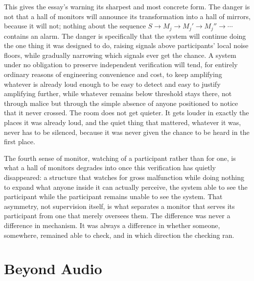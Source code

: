 \documentclass[12pt]{article}
\begin{document}
This gives the essay's warning its sharpest and most concrete form. The danger is not that a hall of monitors will announce its transformation into a hall of mirrors, because it will not; nothing about the sequence $S \to M_j \to M_j' \to M_j'' \to \cdots$ contains an alarm. The danger is specifically that the system will continue doing the one thing it was designed to do, raising signals above participants' local noise floors, while gradually narrowing which signals ever get the chance. A system under no obligation to preserve independent verification will tend, for entirely ordinary reasons of engineering convenience and cost, to keep amplifying whatever is already loud enough to be easy to detect and easy to justify amplifying further, while whatever remains below threshold stays there, not through malice but through the simple absence of anyone positioned to notice that it never crossed. The room does not get quieter. It gets louder in exactly the places it was already loud, and the quiet thing that mattered, whatever it was, never has to be silenced, because it was never given the chance to be heard in the first place.

The fourth sense of monitor, watching of a participant rather than for one, is what a hall of monitors degrades into once this verification has quietly disappeared: a structure that watches for gross malfunction while doing nothing to expand what anyone inside it can actually perceive, the system able to see the participant while the participant remains unable to see the system. That asymmetry, not supervision itself, is what separates a monitor that serves its participant from one that merely oversees them. The difference was never a difference in mechanism. It was always a difference in whether someone, somewhere, remained able to check, and in which direction the checking ran.

\section{Beyond Audio}
\end{document}

